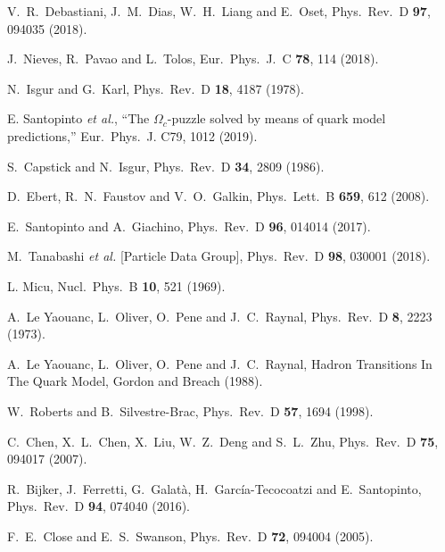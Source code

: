 \documentclass[twocolumn,superscriptaddress,preprintnumbers,nofootinbib]{revtex4}
\begin{document}
\begin{thebibliography}{90}
  V.~R.~Debastiani, J.~M.~Dias, W.~H.~Liang and E.~Oset,
  Phys.\ Rev.\ D {\bf 97}, 094035 (2018).

  J.~Nieves, R.~Pavao and L.~Tolos,
  Eur.\ Phys.\ J.\ C {\bf 78}, 114 (2018).  
  
  N.~Isgur and G.~Karl,
  Phys.\ Rev.\ D {\bf 18}, 4187 (1978).

E. Santopinto {\it et al.},   ``The $\varOmega _{ c}$-puzzle solved by means of quark
                        model predictions,'' Eur.\ Phys.\  J. C79, 1012 (2019).
  
  S.~Capstick and N.~Isgur,
  Phys.\ Rev.\ D {\bf 34}, 2809 (1986).  
  
  D.~Ebert, R.~N.~Faustov and V.~O.~Galkin,
  Phys.\ Lett.\ B {\bf 659}, 612 (2008).
  
  E.~Santopinto and A.~Giachino,
  Phys.\ Rev.\ D {\bf 96}, 014014 (2017).
  
  M.~Tanabashi {\it et al.} [Particle Data Group],
  Phys.\ Rev.\ D {\bf 98}, 030001 (2018).    

  L. Micu,
  Nucl.\ Phys.\ B {\bf 10}, 521 (1969).

  A.~Le Yaouanc, L.~Oliver, O.~Pene and J.~C.~Raynal,
  Phys.\ Rev.\ D {\bf 8}, 2223 (1973).

  A.~Le Yaouanc, L.~Oliver, O.~Pene and J.~C.~Raynal,
  Hadron Transitions In The Quark Model,
  Gordon and Breach (1988).

  W.~Roberts and B.~Silvestre-Brac,
  Phys.\ Rev.\ D {\bf 57}, 1694 (1998).
  
  C.~Chen, X.~L.~Chen, X.~Liu, W.~Z.~Deng and S.~L.~Zhu,
  Phys.\ Rev.\ D {\bf 75}, 094017 (2007).  
  
  R.~Bijker, J.~Ferretti, G.~Galat\`a, H.~Garc\'ia-Tecocoatzi and E.~Santopinto,
  Phys.\ Rev.\ D {\bf 94}, 074040 (2016). 
  
  F.~E.~Close and E.~S.~Swanson,
  Phys.\ Rev.\ D {\bf 72}, 094004 (2005).  

\end{thebibliography}
\end{document}
